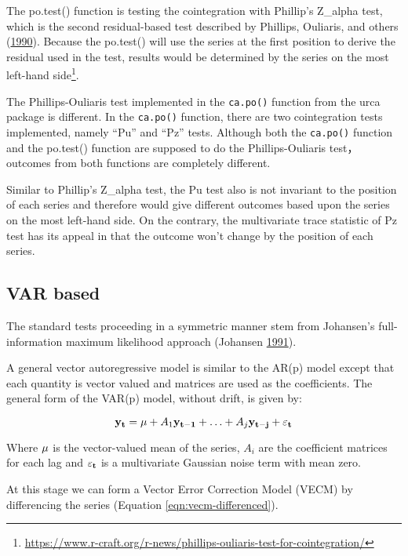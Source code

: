 \documentclass[12pt,]{article}
\let\rmarkdownfootnote\footnote%
\def\footnote{\protect\rmarkdownfootnote}
\begin{document}
The po.test() function is testing the cointegration with Phillip's Z\_alpha test, which is the second residual-based test described by Phillips, Ouliaris, and others (\protect\hyperlink{ref-phillips1990asymptotic}{1990}). Because the po.test() will use the series at the first position to derive the residual used in the test, results would be determined by the series on the most left-hand side\footnote{\url{https://www.r-craft.org/r-news/phillips-ouliaris-test-for-cointegration/}}.

The Phillips-Ouliaris test implemented in the \texttt{ca.po()} function from the urca package is different. In the \texttt{ca.po()} function, there are two cointegration tests implemented, namely ``Pu'' and ``Pz'' tests. Although both the \texttt{ca.po()} function and the po.test() function are supposed to do the Phillips-Ouliaris test，outcomes from both functions are completely different.

Similar to Phillip's Z\_alpha test, the Pu test also is not invariant to the position of each series and therefore would give different outcomes based upon the series on the most left-hand side. On the contrary, the multivariate trace statistic of Pz test has its appeal in that the outcome won't change by the position of each series.

\hypertarget{var-based}{%
\subsection{VAR based}\label{var-based}}

The standard tests proceeding in a symmetric manner stem from Johansen's full-information maximum likelihood approach (Johansen \protect\hyperlink{ref-johansen1991estimation}{1991}).

A general vector autoregressive model is similar to the AR(p) model except that each quantity is vector valued and matrices are used as the coefficients. The general form of the VAR(p) model, without drift, is given by:

\[
\label{eqn:var-general}
{\bf y_t} = {\bf \mu} + A_1 {\bf y_{t-1}} + \ldots + A_j {\bf y_{t-j}} + {\bf \varepsilon_t} 
\]

Where \({\bf \mu}\) is the vector-valued mean of the series, \(A_i\) are the coefficient matrices for each lag and \({\bf \varepsilon_t}\) is a multivariate Gaussian noise term with mean zero.

At this stage we can form a Vector Error Correction Model (VECM) by differencing the series (Equation \ref{eqn:vecm-differenced}).
\end{document}
